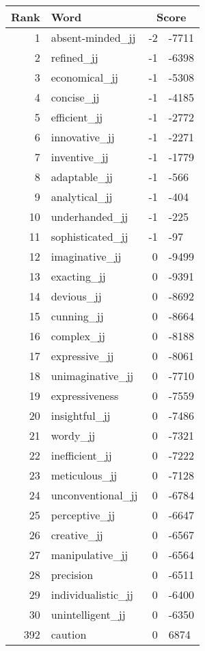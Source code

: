 \begin{longtable}[!htbp]{| rlr@{.}l |}
    \hline
    \textbf{Rank} & \textbf{Word} & \multicolumn{2}{c|}{\textbf{Score}} \\
    \hline
    \endhead
    1 & absent-minded\_jj & -2 & -7711 \\
    2 & refined\_jj & -1 & -6398 \\
    3 & economical\_jj & -1 & -5308 \\
    4 & concise\_jj & -1 & -4185 \\
    5 & efficient\_jj & -1 & -2772 \\
    6 & innovative\_jj & -1 & -2271 \\
    7 & inventive\_jj & -1 & -1779 \\
    8 & adaptable\_jj & -1 & -566 \\
    9 & analytical\_jj & -1 & -404 \\
    10 & underhanded\_jj & -1 & -225 \\
    11 & sophisticated\_jj & -1 & -97 \\
    12 & imaginative\_jj & 0 & -9499 \\
    13 & exacting\_jj & 0 & -9391 \\
    14 & devious\_jj & 0 & -8692 \\
    15 & cunning\_jj & 0 & -8664 \\
    16 & complex\_jj & 0 & -8188 \\
    17 & expressive\_jj & 0 & -8061 \\
    18 & unimaginative\_jj & 0 & -7710 \\
    19 & expressiveness & 0 & -7559 \\
    20 & insightful\_jj & 0 & -7486 \\
    21 & wordy\_jj & 0 & -7321 \\
    22 & inefficient\_jj & 0 & -7222 \\
    23 & meticulous\_jj & 0 & -7128 \\
    24 & unconventional\_jj & 0 & -6784 \\
    25 & perceptive\_jj & 0 & -6647 \\
    26 & creative\_jj & 0 & -6567 \\
    27 & manipulative\_jj & 0 & -6564 \\
    28 & precision & 0 & -6511 \\
    29 & individualistic\_jj & 0 & -6400 \\
    30 & unintelligent\_jj & 0 & -6350 \\
    392 & caution & 0 & 6874 \\

\end{longtable}
